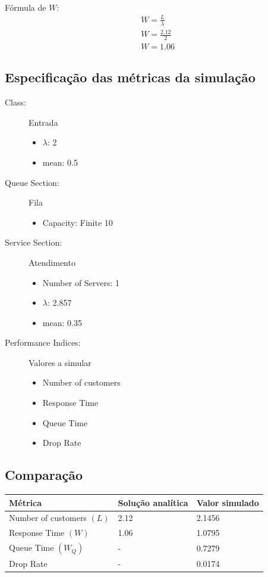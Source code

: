 \documentclass[12pt,a4paper]{article}
\begin{document}
\noindent
\\
Fórmula de \(W\):
\begin{equation*}
	\begin{aligned}
		&W = \frac{L}{\lambda} \\
		&W = \frac{2.12}{2} \\
		&W = {1.06} 
	\end{aligned}
\end{equation*}

\subsection{Especificação das métricas da simulação}
\begin{description}
	\item[Class:] Entrada 
	\begin{itemize}
		\item $\lambda$: 2
		\item mean: 0.5
	\end{itemize}
	\item[Queue Section:] Fila
	\begin{itemize}
		\item Capacity: Finite 10
	\end{itemize}
	\item[Service Section:] Atendimento
	\begin{itemize}
		\item Number of Servers: 1
		\item $\lambda$: 2.857
		\item mean: 0.35
	\end{itemize}
	\item[Performance Indices:] Valores a simular 
	\begin{itemize}
		\item Number of customers
		\item Response Time
		\item Queue Time
		\item Drop Rate
	\end{itemize}
\end{description}

\subsection{Comparação}

\begin{table}[h]
	\centering
	\begin{tabular}{|l|l|l|} 
		\hline
		\textbf{Métrica} & \textbf{Solução analítica} & \textbf{Valor simulado} \\ 
		\hline
		Number of customers \((L)\) & 2.12 & 2.1456 \\
		\hline
		Response Time \((W)\) & 1.06 & 1.0795 \\
		\hline
		Queue Time \((W_{Q})\) & - & 0.7279 \\
		\hline
		Drop Rate & - & 0.0174 \\
		\hline
	\end{tabular}
\end{table}
\end{document}
